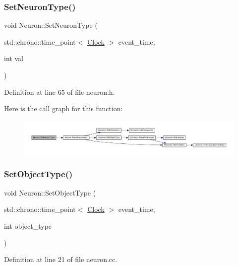 \subsubsection{\texorpdfstring{Set\+Neuron\+Type()}{SetNeuronType()}}
{\footnotesize\ttfamily void Neuron\+::\+Set\+Neuron\+Type (\begin{DoxyParamCaption}\item[{std\+::chrono\+::time\+\_\+point$<$ \hyperlink{universe_8h_a0ef8d951d1ca5ab3cfaf7ab4c7a6fd80}{Clock} $>$}]{event\+\_\+time,  }\item[{int}]{val }\end{DoxyParamCaption})\hspace{0.3cm}{\ttfamily [inline]}}



Definition at line 65 of file neuron.\+h.

Here is the call graph for this function\+:
\nopagebreak
\begin{figure}[H]
\begin{center}
\leavevmode
\includegraphics[width=350pt]{class_neuron_afc685a0444425fceab6685a6ee004b65_cgraph}
\end{center}
\end{figure}
\mbox{\label{class_neuron_ab371e2dacf2cdde8db5547b72fb45ca1}} 
\subsubsection{\texorpdfstring{Set\+Object\+Type()}{SetObjectType()}}
{\footnotesize\ttfamily void Neuron\+::\+Set\+Object\+Type (\begin{DoxyParamCaption}\item[{std\+::chrono\+::time\+\_\+point$<$ \hyperlink{universe_8h_a0ef8d951d1ca5ab3cfaf7ab4c7a6fd80}{Clock} $>$}]{event\+\_\+time,  }\item[{int}]{object\+\_\+type }\end{DoxyParamCaption})}



Definition at line 21 of file neuron.\+cc.

